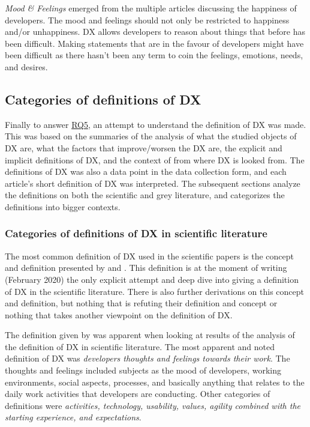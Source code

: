 \documentclass[english, 12pt, a4paper, sci, utf8, a-1b, online]{aaltothesis}
\newcommand{\now}{February 2020}
\begin{document}
\textit{Mood \& Feelings} emerged from the multiple articles discussing the happiness of developers. The mood and feelings should not only be restricted to happiness and/or unhappiness. DX allows developers to reason about things that before has been difficult. Making statements that are in the favour of developers might have been difficult as there hasn't been any term to coin the feelings, emotions, needs, and desires.

\subsection{Categories of definitions of DX}

Finally to answer \hyperref[RQ5]{RQ5}, an attempt to understand the definition of DX was made. This was based on the summaries of the analysis of what the studied objects of DX are, what the factors that improve/worsen the DX are, the explicit and implicit definitions of DX, and the context of from where DX is looked from. The definitions of DX was also a data point in the data collection form, and each article's short definition of DX was interpreted. The subsequent sections analyze the definitions on both the scientific and grey literature, and categorizes the definitions into bigger contexts.

\subsubsection{Categories of definitions of DX in scientific literature}

The most common definition of DX used in the scientific papers is the concept and definition presented by \textcite{fagerholm-dx-concept-and-definition} and \textcite{fagerholm-doctoral-thesis}. This definition is at the moment of writing (\now) the only explicit attempt and deep dive into giving a definition of DX in the scientific literature. There is also further derivations on this concept and definition, but nothing that is refuting their definition and concept or nothing that takes another viewpoint on the definition of DX.

The definition given by \textcite{fagerholm-dx-concept-and-definition} was apparent when looking at results of the analysis of the definition of DX in scientific literature. The most apparent and noted definition of DX was \textit{developers thoughts and feelings towards their work}. The thoughts and feelings included subjects as the mood of developers, working environments, social aspects, processes, and basically anything that relates to the daily work activities that developers are conducting. Other categories of definitions were \textit{activities, technology, usability, values, agility combined with the starting experience, and expectations}.
\end{document}
